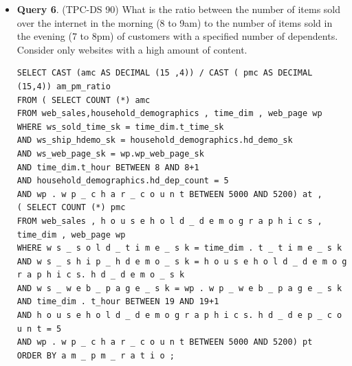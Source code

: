 \documentclass[12pt]{book}
\begin{document}
\begin{itemize}
\item \textbf{Query 6}. (TPC-DS 90) What is the ratio between the number of items sold over the internet in the morning (8 to 9am) to the 
number of items sold in the evening (7 to 8pm) of customers with a specified number of dependents. Consider only websites with a high amount 
of content.
\begin{lstlisting}[frame=single]
SELECT CAST (amc AS DECIMAL (15 ,4)) / CAST ( pmc AS DECIMAL (15,4)) am_pm_ratio
FROM ( SELECT COUNT (*) amc
FROM web_sales,household_demographics , time_dim , web_page wp
WHERE ws_sold_time_sk = time_dim.t_time_sk
AND ws_ship_hdemo_sk = household_demographics.hd_demo_sk
AND ws_web_page_sk = wp.wp_web_page_sk
AND time_dim.t_hour BETWEEN 8 AND 8+1
AND household_demographics.hd_dep_count = 5
AND wp . w p _ c h a r _ c o u n t BETWEEN 5000 AND 5200) at ,
( SELECT COUNT (*) pmc
FROM web_sales , h o u s e h o l d _ d e m o g r a p h i c s , time_dim , web_page wp
WHERE w s _ s o l d _ t i m e _ s k = time_dim . t _ t i m e _ s k
AND w s _ s h i p _ h d e m o _ s k = h o u s e h o l d _ d e m o g r a p h i c s. h d _ d e m o _ s k
AND w s _ w e b _ p a g e _ s k = wp . w p _ w e b _ p a g e _ s k
AND time_dim . t_hour BETWEEN 19 AND 19+1
AND h o u s e h o l d _ d e m o g r a p h i c s. h d _ d e p _ c o u n t = 5
AND wp . w p _ c h a r _ c o u n t BETWEEN 5000 AND 5200) pt
ORDER BY a m _ p m _ r a t i o ;
\end{lstlisting}


\end{itemize}
\end{document}
